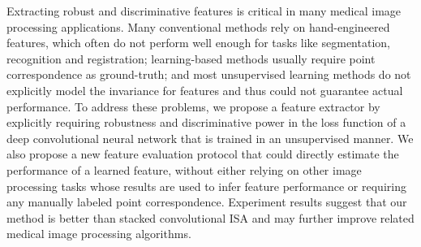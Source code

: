 Extracting robust and discriminative features is critical in many medical
image processing applications. Many conventional methods rely on
hand-engineered features, which often do not perform well enough for tasks
like segmentation, recognition and registration; learning-based methods
usually require point correspondence as ground-truth; and most unsupervised
learning methods do not explicitly model the invariance for features and thus
could not guarantee actual performance.  To address these problems, we propose
a feature extractor by explicitly requiring robustness and discriminative
power in the loss function of a deep convolutional neural network that is
trained in an unsupervised manner. We also propose a new feature evaluation
protocol that could directly estimate the performance of a learned feature,
without either relying on other image processing tasks whose results are used
to infer feature performance or requiring any manually labeled point
correspondence. Experiment results suggest that our method is better than
stacked convolutional ISA and may further improve related medical image
processing algorithms.

